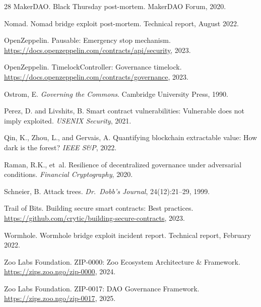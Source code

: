 \documentclass[11pt,letterpaper]{article}
\begin{document}
\begin{thebibliography}{28}
MakerDAO.
\newblock Black Thursday post-mortem.
\newblock MakerDAO Forum, 2020.

Nomad.
\newblock Nomad bridge exploit post-mortem.
\newblock Technical report, August 2022.

OpenZeppelin.
\newblock Pausable: Emergency stop mechanism.
\newblock \url{https://docs.openzeppelin.com/contracts/api/security}, 2023.

OpenZeppelin.
\newblock TimelockController: Governance timelock.
\newblock \url{https://docs.openzeppelin.com/contracts/governance}, 2023.

Ostrom, E.
\newblock \emph{Governing the Commons}.
\newblock Cambridge University Press, 1990.

Perez, D. and Livshits, B.
\newblock Smart contract vulnerabilities: Vulnerable does not imply exploited.
\newblock \emph{USENIX Security}, 2021.

Qin, K., Zhou, L., and Gervais, A.
\newblock Quantifying blockchain extractable value: How dark is the forest?
\newblock \emph{IEEE S\&P}, 2022.

Raman, R.K., et~al.
\newblock Resilience of decentralized governance under adversarial conditions.
\newblock \emph{Financial Cryptography}, 2020.

Schneier, B.
\newblock Attack trees.
\newblock \emph{Dr.\ Dobb's Journal}, 24(12):21--29, 1999.

Trail of Bits.
\newblock Building secure smart contracts: Best practices.
\newblock \url{https://github.com/crytic/building-secure-contracts}, 2023.

Wormhole.
\newblock Wormhole bridge exploit incident report.
\newblock Technical report, February 2022.

Zoo Labs Foundation.
\newblock ZIP-0000: Zoo Ecosystem Architecture \& Framework.
\newblock \url{https://zips.zoo.ngo/zip-0000}, 2024.

Zoo Labs Foundation.
\newblock ZIP-0017: DAO Governance Framework.
\newblock \url{https://zips.zoo.ngo/zip-0017}, 2025.


\end{thebibliography}
\end{document}
